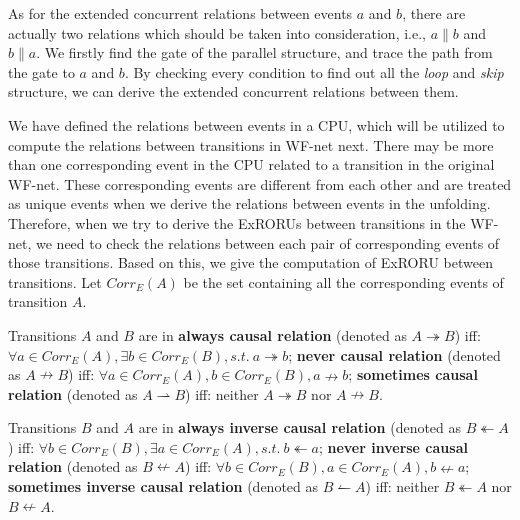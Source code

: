 \documentclass[dvips,...]{llncs}
\begin{document}
As for the extended concurrent relations between events $a$ and $b$, there are actually two relations which should be taken into consideration, i.e., $a\parallel b$ and $b\parallel a$. We firstly find the gate of the parallel structure, and trace the path from the gate to $a$ and $b$. By checking every condition to find out all the \textit{loop} and \textit{skip} structure, we can derive the extended concurrent relations between them.

We have defined the relations between events in a CPU, which will be utilized to compute the relations between transitions in WF-net next. There may be more than one corresponding event in the CPU related to a transition in the original WF-net. These corresponding events are different from each other and are treated as unique events when we derive the relations between events in the unfolding. Therefore, when we try to derive the ExRORUs between transitions in the WF-net, we need to check the relations between each pair of corresponding events of those transitions. Based on this, we give the computation of ExRORU between transitions. Let $Corr_{E}(A)$ be the set containing all the corresponding events of transition $A$.

\begin{definition}\label{def:causalRelations}
Transitions $A$ and $B$ are in \textbf{always causal relation} (denoted as $A\twoheadrightarrow B$) iff: $\forall a\in Corr_{E}(A), \exists b\in Corr_{E}(B), s.t.~a\twoheadrightarrow b$; \textbf{never causal relation} (denoted as $A\nrightarrow B$) iff: $\forall a\in Corr_{E}(A), b\in Corr_{E}(B), a\nrightarrow b$; \textbf{sometimes causal relation} (denoted as $A\rightharpoonup B$) iff: neither $A\twoheadrightarrow B$ nor $A\nrightarrow B$.
\end{definition}

\begin{definition}\label{def:inverseCausalRelations}
Transitions $B$ and $A$ are in \textbf{always inverse causal relation} (denoted as $B\twoheadleftarrow A$) iff: $\forall b\in Corr_{E}(B), \exists a\in Corr_{E}(A), s.t.~b\twoheadleftarrow a$; \textbf{never inverse causal relation} (denoted as $B\nleftarrow A$) iff: $\forall b\in Corr_{E}(B), a\in Corr_{E}(A), b\nleftarrow a$; \textbf{sometimes inverse causal relation} (denoted as $B\leftharpoonup A$) iff: neither $B\twoheadleftarrow A$ nor $B\nleftarrow A$.
\end{definition}
\end{document}
